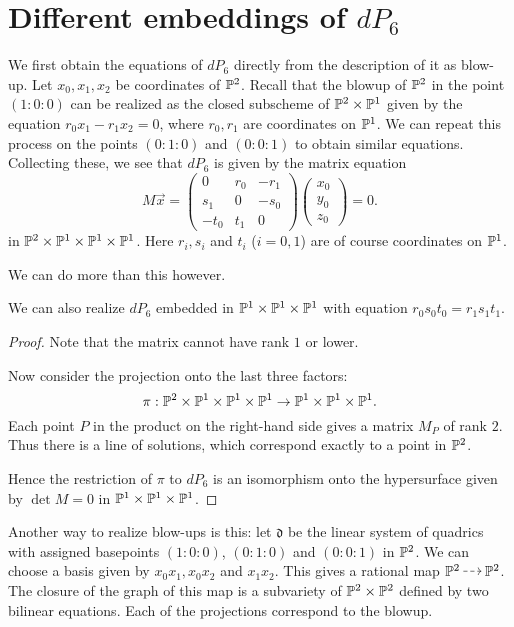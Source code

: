 \documentclass[]{uiophd}
\begin{document}
\section{Different embeddings of $dP_6$}

We first obtain the equations of $dP_6$ directly from the description of it as blow-up. Let $x_0,x_1,x_2$ be coordinates of $\mathbb{P}^2$. Recall that the blowup of $\mathbb{P}^2$ in the point $(1:0:0)$ can be realized as the closed subscheme of $\mathbb{P}^2 \times \mathbb{P}^1$ given by the equation $r_0x_1-r_1x_2=0$, where $r_0,r_1$ are coordinates on $\mathbb{P}^1$. We can repeat this process on the points $(0:1:0)$ and $(0:0:1)$ to obtain similar equations. Collecting these, we see that $dP_6$ is given by the matrix equation
\[
M\vec x = 
\begin{pmatrix}
0 & r_0 & -r_1 \\
s_1 & 0 & -s_0 \\
-t_0 & t_1 & 0
\end{pmatrix}
\begin{pmatrix}
x_0 \\ y_0 \\ z_0
\end{pmatrix}= 0.
\]
in $\mathbb{P}^2 \times \mathbb{P}^1 \times \mathbb{P}^1 \times \mathbb{P}^1$. Here $r_i,s_i$ and $t_i$ ($i=0,1$) are of course coordinates on $\mathbb{P}^1$.

We can do more than this however. 

\begin{lemma}
We can also realize $dP_6$ embedded in $\mathbb{P}^1 \times \mathbb{P}^1 \times \mathbb{P}^1$ with equation $r_0s_0t_0=r_1s_1t_1$.
\end{lemma}
\begin{proof}
Note that the matrix cannot have rank $1$ or lower.

Now consider the projection onto the last three factors:
$$
\pi:\mathbb{P}^2 \times \mathbb{P}^1 \times \mathbb{P}^1 \times \mathbb{P}^1 \to \mathbb{P}^1 \times \mathbb{P}^1 \times \mathbb{P}^1.
$$
Each point $P$ in the product on the right-hand side gives a matrix $M_P$ of rank $2$. Thus there is a line of solutions, which correspond exactly to a point in $\mathbb{P}^2$.

Hence the restriction of $\pi$ to $dP_6$ is an isomorphism onto the hypersurface given by $\det M=0$ in $\mathbb{P}^1 \times \mathbb{P}^1 \times \mathbb{P}^1$. 
\end{proof}

Another way to realize blow-ups is this: let $\mathfrak d$ be the linear system of quadrics with assigned basepoints $(1:0:0)$, $(0:1:0)$ and $(0:0:1)$ in $\mathbb{P}^2$. We can choose a basis given by $x_0x_1,x_0x_2$ and $x_1x_2$. This gives a rational map $\PP^2 \rmap \PP^2$. The closure of the graph of this map is a subvariety of $\mathbb{P}^2 \times \mathbb{P}^2$ defined by two bilinear equations. Each of the projections correspond to the blowup.
\end{document}
